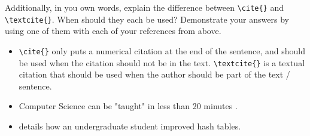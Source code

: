 \documentclass[10pt,twocolumn]{article}
\begin{document}
Additionally, in you own words, explain the difference between \texttt{{\textbackslash}cite\{\}} and \texttt{{\textbackslash}textcite\{\}}. When should they each be used? Demonstrate your answers by using one of them with each of your references from above.
    \begin{itemize}
        \item \texttt{{\textbackslash}cite\{\}} only puts a numerical citation at the end of the sentence, and should be used when the citation should not be in the text. \texttt{{\textbackslash}textcite\{\}} is a textual citation that should be used when the author should be part of the text / sentence.
        \item Computer Science can be "taught" in less than 20 minutes \cite{Video}.
        \item \textcite{Magazine} details how an undergraduate student improved hash tables.
    \end{itemize}

\printbibliography
\end{document}
